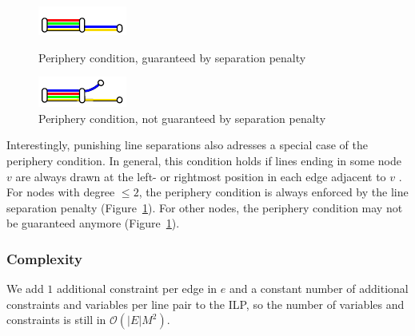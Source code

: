 \documentclass{llncs}
\begin{document}
\begin{figure}[t]
\centering
\begin{minipage}{.48\textwidth}
  \centering
	\includegraphics[trim={0 1.22 0 0},clip,width=.8\textwidth]{render_examples/periphery/periphery_example1.pdf}
	\caption{Periphery condition, guaranteed by separation penalty}
	\label{FIG:periphery1}
\end{minipage}%
\hfill
\begin{minipage}{.48\textwidth}
  \centering
	\includegraphics[trim={0 1.75 0 0},clip,width=.8\textwidth]{render_examples/periphery/periphery_example2.pdf}
	\caption{Periphery condition, not guaranteed by separation penalty}
	\label{FIG:periphery2}
\end{minipage}
\end{figure}

Interestingly, punishing line separations also adresses a special case of the periphery condition. In general, this condition holds if lines ending in some node $v$ are always drawn at the left- or rightmost position in each edge adjacent to $v$ \cite{asq08}. For nodes with degree $\leq 2$, the periphery condition is always enforced by the line separation penalty (Figure~\ref{FIG:periphery2}). For other nodes, the periphery condition may not be guaranteed anymore (Figure~\ref{FIG:periphery2}).

\subsubsection{Complexity}
We add $1$ additional constraint per edge in $e$ and a constant number of additional constraints and variables per line pair to the ILP, so the number of variables and constraints is still in $\mathcal{O}(|E|M^2)$.
\end{document}
